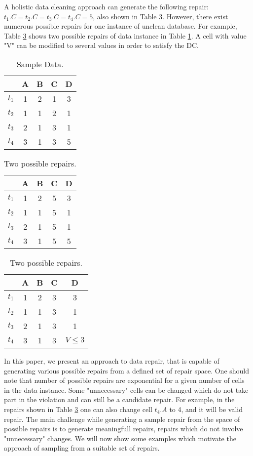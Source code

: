 A holistic data cleaning approach can generate the following repair:
$t_1.C = t_2.C = t_3.C = t_4.C = 5$, also shown in Table \ref{table:eg2}.
However, there exist numerous possible repairs for one instance of unclean database.
For example, Table \ref{table:eg2} shows two possible repairs of data instance in Table \ref{table:eg1}.
A cell with value "V" can be modified to several values in order to satisfy the DC.

\begin{table} 
\centering 
\begin{tabular}{|c|c|c|c|c|}  \hline
      & A & B & C & D 	\\ \hline
   $t_1$ & 1 & 2 & 1 & 3 	\\ \hline
   $t_2$ & 1 & 1 & 2 & 1 	\\ \hline
   $t_3$ & 2 & 1 & 3 & 1 	\\ \hline
   $t_4$ & 3 & 1 & 3 & 5 	\\ \hline
\end{tabular}
\caption{Sample Data.}
\label{table:eg1}
\end{table}

\begin{table} 
\centering 
\begin{tabular}{|c|c|c|c|c|}  \hline
      & A & B & C & D 	\\ \hline
   $t_1$ & 1 & 2 & \cellcolor[gray]{0.9} 5 & 3 	\\ \hline
   $t_2$ & 1 & 1 & \cellcolor[gray]{0.9} 5 & 1 	\\ \hline
   $t_3$ & 2 & 1 & \cellcolor[gray]{0.9} 5 & 1 	\\ \hline
   $t_4$ & 3 & 1 & \cellcolor[gray]{0.9} 5 & 5 	\\ \hline
\end{tabular}
\quad
\begin{tabular}{|c|c|c|c|c|}  \hline
      & A & B & C & D 	\\ \hline
   $t_1$ & 1 & 2 & \cellcolor[gray]{0.9} 3 & 3 	\\ \hline
   $t_2$ & 1 & 1 & \cellcolor[gray]{0.9} 3 & 1 	\\ \hline
   $t_3$ & 2 & 1 & 3 & 1 	\\ \hline
   $t_4$ & 3 & 1 & 3 & \cellcolor[gray]{0.9} $V \leq 3$ 	\\ \hline
\end{tabular}
\caption{Two possible repairs.}
\label{table:eg2}
\end{table}

In this paper, we present an approach to data repair, that is capable of generating various possible repairs from a defined set of repair space.
One should note that number of possible repairs are exponential for a given number of cells in the data instance.
Some "unnecessary" cells can be changed which do not take part in the violation and can still be a candidate repair.
For example, in the repairs shown in Table \ref{table:eg2} one can also change cell $t_4.A$ to 4, and it will be valid repair.
The main challenge while generating a sample repair from the space of possible repairs is to generate meaningfull repairs, repairs which do not involve "unnecessary" changes.
We will now show some examples which motivate the approach of sampling from a suitable set of repairs.

